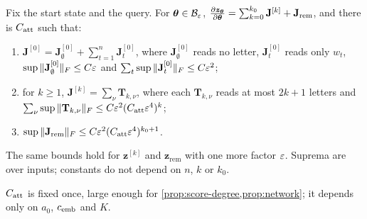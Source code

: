 \begin{proposition}
\label{prop:score-degree}
Fix the start state and the query. For $\bm\theta\in\mathcal B_{\varepsilon}$, $\Jz=\sum_{k=0}^{k_0}\mathbf J^{[k]}+\mathbf J_{\mathrm{rem}}$, and there is $C_{\mathrm{att}}$ such that:
\begin{enumerate}[label=(\roman*),leftmargin=*,itemsep=2pt,topsep=2pt]
\item $\mathbf J^{[0]}=\mathbf J^{[0]}_\emptyset+\sum_{t=1}^n\mathbf J^{[0]}_t$, where $\mathbf J^{[0]}_\emptyset$ reads no letter, $\mathbf J^{[0]}_t$ reads only $w_t$, $\sup\|\mathbf J^{[0]}_\emptyset\|_F\le C\varepsilon$ and
$\sum_t\sup\|\mathbf J^{[0]}_t\|_F\le C\varepsilon^2$;
\item for $k\ge1$, $\mathbf J^{[k]}=\sum_\nu\mathbf T_{k,\nu}$, where each $\mathbf T_{k,\nu}$ reads at most $2k+1$ letters and $\sum_\nu\sup\|\mathbf T_{k,\nu}\|_F\le C\varepsilon^2(C_{\mathrm{att}}\varepsilon^4)^k$;
\item $\sup\|\mathbf J_{\mathrm{rem}}\|_F\le C\varepsilon^2(C_{\mathrm{att}}\varepsilon^4)^{k_0+1}$.
\end{enumerate}
The same bounds hold for $\bm z^{[k]}$ and $\bm z_{\mathrm{rem}}$ with one more factor $\varepsilon$. Suprema are over inputs; constants do not depend on
$n$, $k$ or $k_0$.
\end{proposition}

$C_{\mathrm{att}}$ is fixed once, large enough for \cref{prop:score-degree,prop:network}; it depends only on $a_0$, $c_{\mathrm{emb}}$ and $K$.

\label{app:network}

